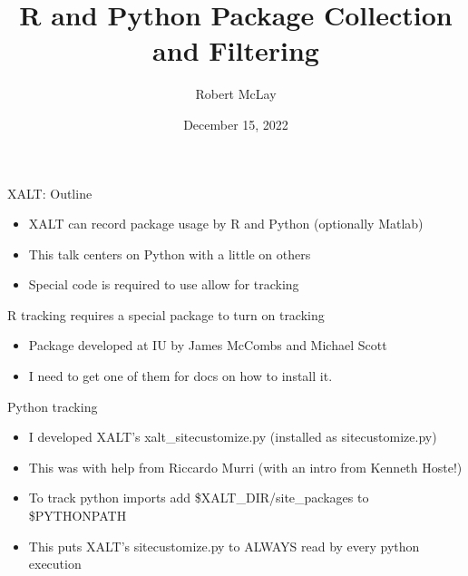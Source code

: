 \documentclass{beamer}
\begin{document}
\title[XALT]{R and Python Package Collection and Filtering}
\author{Robert McLay}
\date{December 15, 2022}

\frame{\titlepage}

\begin{frame}{XALT: Outline}
  \begin{itemize}
    \item XALT can record package usage by R and Python (optionally Matlab)
    \item This talk centers on Python with a little on others
    \item Special code is required to use allow for tracking
  \end{itemize}
\end{frame}

\begin{frame}{R tracking requires a special package to turn on tracking}
  \begin{itemize}
    \item Package developed at IU by James McCombs and Michael Scott
    \item I need to get one of them for docs on how to install it.
  \end{itemize}
\end{frame}

\begin{frame}{Python tracking}
  \begin{itemize}
    \item I developed XALT's xalt\_sitecustomize.py (installed as sitecustomize.py)
    \item This was with help from Riccardo Murri (with an intro from
      Kenneth Hoste!)
    \item To track python imports add \$XALT\_DIR/site\_packages to
      \$PYTHONPATH
    \item This puts XALT's sitecustomize.py to ALWAYS read by
      every python execution
  \end{itemize}
\end{frame}
\end{document}
